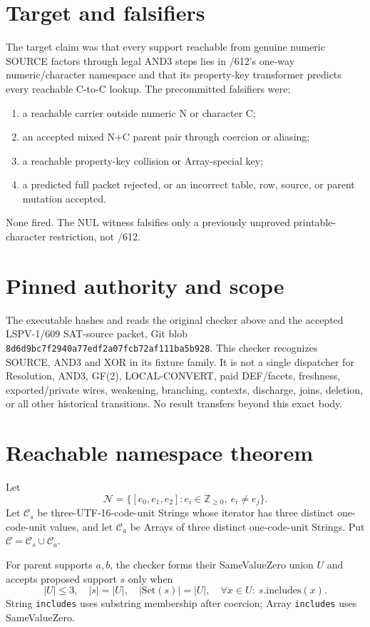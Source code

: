 \documentclass[11pt]{article}
\begin{document}
\section*{Target and falsifiers}
The target claim was that every support reachable from genuine numeric
SOURCE factors through legal AND3 steps lies in /612's one-way
numeric/character namespace and that its property-key transformer predicts
every reachable C-to-C lookup.  The precommitted falsifiers were:
\begin{enumerate}
\item a reachable carrier outside numeric N or character C;
\item an accepted mixed N+C parent pair through coercion or aliasing;
\item a reachable property-key collision or Array-special key;
\item a predicted full packet rejected, or an incorrect table, row, source,
or parent mutation accepted.
\end{enumerate}
None fired.  The NUL witness falsifies only a previously unproved
printable-character restriction, not /612.

\section*{Pinned authority and scope}
The executable hashes and reads the original checker above and the accepted
LSPV-1/609 SAT-source packet, Git blob
\texttt{8d6d9bc7f2940a77edf2a07fcb72af111ba5b928}.  This checker recognizes
SOURCE, AND3 and XOR in its fixture family.  It is not a single dispatcher
for Resolution, AND3, GF(2), LOCAL-CONVERT, paid DEF/facets, freshness,
exported/private wires, weakening, branching, contexts, discharge, joins,
deletion, or all other historical transitions.  No result transfers beyond
this exact body.

\section*{Reachable namespace theorem}
Let
\[
\mathcal N=\{[e_0,e_1,e_2]:e_i\in\mathbb Z_{\ge0},\ e_i\ne e_j\}.
\]
Let $\mathcal C_s$ be three-UTF-16-code-unit Strings whose iterator has three
distinct one-code-unit values, and let $\mathcal C_a$ be Arrays of three
distinct one-code-unit Strings.  Put
$\mathcal C=\mathcal C_s\cup\mathcal C_a$.

For parent supports $a,b$, the checker forms their SameValueZero union $U$
and accepts proposed support $s$ only when
\[
|U|\le3,\quad |s|=|U|,\quad |\mathrm{Set}(s)|=|U|,
\quad \forall x\in U:\ s.\mathrm{includes}(x).
\]
String \texttt{includes} uses substring membership after coercion; Array
\texttt{includes} uses SameValueZero.
\end{document}
